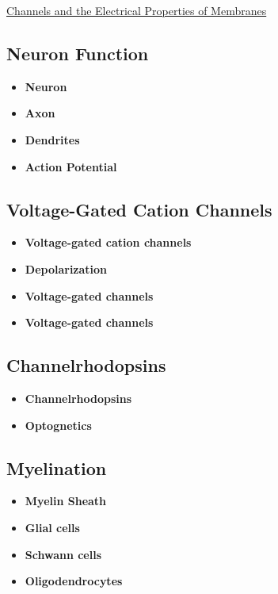 \documentclass[12pt,letterpaper]{article}
\begin{document}
\begin{secbox}{\hyperlink{11}{Channels and the Electrical Properties of Membranes}}
{    \hypertarget{11.3.6}{\subsection*{Neuron Function}}
    \begin{itemize}
        \item \textbf{Neuron}
        \item \textbf{Axon}
        \item \textbf{Dendrites}
        \item \textbf{Action Potential}
    \end{itemize}
    
    \hypertarget{11.3.7}{\subsection*{Voltage-Gated Cation Channels}}
    \begin{itemize}
        \item \textbf{Voltage-gated cation channels}
        \item \textbf{Depolarization}
        \item \textbf{Voltage-gated  channels}
        \item \textbf{Voltage-gated  channels}
    \end{itemize}
    
    \hypertarget{11.3.8}{\subsection*{Channelrhodopsins}}
    \begin{itemize}
        \item \textbf{Channelrhodopsins}
        \item \textbf{Optognetics}
    \end{itemize}
    
    \hypertarget{11.3.9}{\subsection*{Myelination}}
    \begin{itemize}
        \item \textbf{Myelin Sheath}
        \item \textbf{Glial cells}
        \item \textbf{Schwann cells}
        \item \textbf{Oligodendrocytes}
    \end{itemize}
    
}
\end{secbox}
\end{document}
